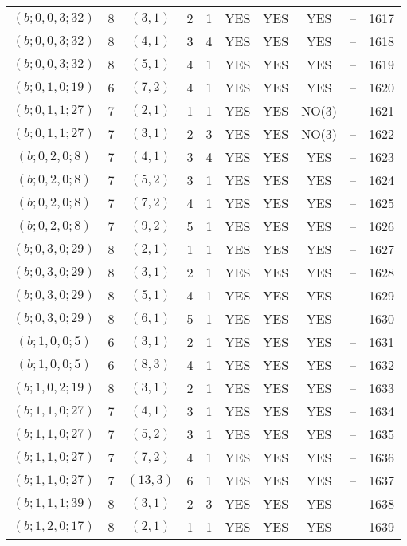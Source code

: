 \begin{longtable}{|c|c|c|c|c|c|c|c|c|c|}
$(b; 0, 0, 3; 32)$ & 8 & $(3, 1)$ & 2 & 1 & YES & YES & YES & -- & 1617\\
$(b; 0, 0, 3; 32)$ & 8 & $(4, 1)$ & 3 & 4 & YES & YES & YES & -- & 1618\\
$(b; 0, 0, 3; 32)$ & 8 & $(5, 1)$ & 4 & 1 & YES & YES & YES & -- & 1619\\
$(b; 0, 1, 0; 19)$ & 6 & $(7, 2)$ & 4 & 1 & YES & YES & YES & -- & 1620\\
$(b; 0, 1, 1; 27)$ & 7 & $(2, 1)$ & 1 & 1 & YES & YES & NO(3) & -- & 1621\\
$(b; 0, 1, 1; 27)$ & 7 & $(3, 1)$ & 2 & 3 & YES & YES & NO(3) & -- & 1622\\
$(b; 0, 2, 0; 8)$ & 7 & $(4, 1)$ & 3 & 4 & YES & YES & YES & -- & 1623\\
$(b; 0, 2, 0; 8)$ & 7 & $(5, 2)$ & 3 & 1 & YES & YES & YES & -- & 1624\\
$(b; 0, 2, 0; 8)$ & 7 & $(7, 2)$ & 4 & 1 & YES & YES & YES & -- & 1625\\
$(b; 0, 2, 0; 8)$ & 7 & $(9, 2)$ & 5 & 1 & YES & YES & YES & -- & 1626\\
$(b; 0, 3, 0; 29)$ & 8 & $(2, 1)$ & 1 & 1 & YES & YES & YES & -- & 1627\\
$(b; 0, 3, 0; 29)$ & 8 & $(3, 1)$ & 2 & 1 & YES & YES & YES & -- & 1628\\
$(b; 0, 3, 0; 29)$ & 8 & $(5, 1)$ & 4 & 1 & YES & YES & YES & -- & 1629\\
$(b; 0, 3, 0; 29)$ & 8 & $(6, 1)$ & 5 & 1 & YES & YES & YES & -- & 1630\\
$(b; 1, 0, 0; 5)$ & 6 & $(3, 1)$ & 2 & 1 & YES & YES & YES & -- & 1631\\
$(b; 1, 0, 0; 5)$ & 6 & $(8, 3)$ & 4 & 1 & YES & YES & YES & -- & 1632\\
$(b; 1, 0, 2; 19)$ & 8 & $(3, 1)$ & 2 & 1 & YES & YES & YES & -- & 1633\\
$(b; 1, 1, 0; 27)$ & 7 & $(4, 1)$ & 3 & 1 & YES & YES & YES & -- & 1634\\
$(b; 1, 1, 0; 27)$ & 7 & $(5, 2)$ & 3 & 1 & YES & YES & YES & -- & 1635\\
$(b; 1, 1, 0; 27)$ & 7 & $(7, 2)$ & 4 & 1 & YES & YES & YES & -- & 1636\\
$(b; 1, 1, 0; 27)$ & 7 & $(13, 3)$ & 6 & 1 & YES & YES & YES & -- & 1637\\
$(b; 1, 1, 1; 39)$ & 8 & $(3, 1)$ & 2 & 3 & YES & YES & YES & -- & 1638\\
$(b; 1, 2, 0; 17)$ & 8 & $(2, 1)$ & 1 & 1 & YES & YES & YES & -- & 1639\\

\end{longtable}
